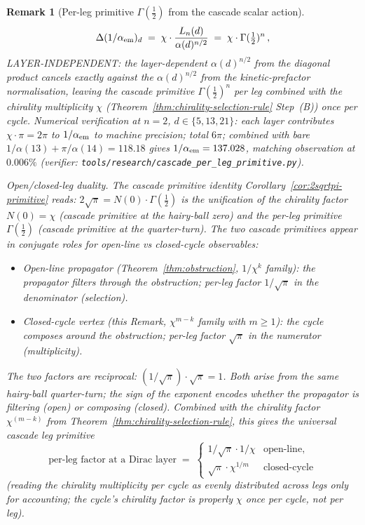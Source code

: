 \documentclass[12pt,a4paper]{article}
\newtheorem*{remark}{Remark}
\begin{document}
\begin{remark}[Per-leg primitive $\Gamma(\tfrac{1}{2})$ from the cascade scalar action]
\[\Delta(1/\alpha_{\rm em})_d \;=\; \chi\cdot\frac{L_n(d)}{\alpha(d)^{n/2}} \;=\; \chi\cdot\Gamma(\tfrac{1}{2})^n\,,
\]
LAYER-INDEPENDENT: the layer-dependent $\alpha(d)^{n/2}$ from the diagonal product cancels exactly against the $\alpha(d)^{n/2}$ from the kinetic-prefactor normalisation, leaving the cascade primitive $\Gamma(\tfrac{1}{2})^n$ per leg combined with the chirality multiplicity $\chi$ (Theorem~\ref{thm:chirality-selection-rule} Step~(B)) once per cycle. Numerical verification at $n=2$, $d\in\{5,13,21\}$: each layer contributes $\chi\cdot\pi = 2\pi$ to $1/\alpha_{\rm em}$ to machine precision; total $6\pi$; combined with bare $1/\alpha(13) + \pi/\alpha(14) = 118.18$ gives $1/\alpha_{\rm em} = 137.028$, matching observation at $0.006\%$ (verifier: \texttt{tools/research/cascade\_per\_leg\_primitive.py}).

\medskip\noindent\emph{Open/closed-leg duality.} The cascade primitive identity Corollary~\ref{cor:2sqrtpi-primitive} reads: $2\sqrt{\pi} = N(0)\cdot\Gamma(\tfrac{1}{2})$ is the unification of the chirality factor $N(0)=\chi$ (cascade primitive at the hairy-ball zero) and the per-leg primitive $\Gamma(\tfrac{1}{2})$ (cascade primitive at the quarter-turn). The two cascade primitives appear in conjugate roles for open-line vs closed-cycle observables:
\begin{itemize}[nosep]
\item \emph{Open-line propagator} (Theorem~\ref{thm:obstruction}, $1/\chi^k$ family): the propagator filters through the obstruction; per-leg factor $1/\sqrt{\pi}$ in the denominator (selection).
\item \emph{Closed-cycle vertex} (this Remark, $\chi^{m-k}$ family with $m\geq 1$): the cycle composes around the obstruction; per-leg factor $\sqrt{\pi}$ in the numerator (multiplicity).
\end{itemize}
The two factors are reciprocal: $(1/\sqrt{\pi})\cdot\sqrt{\pi} = 1$. Both arise from the same hairy-ball quarter-turn; the sign of the exponent encodes whether the propagator is filtering (open) or composing (closed). Combined with the chirality factor $\chi^{(m-k)}$ from Theorem~\ref{thm:chirality-selection-rule}, this gives the universal cascade leg primitive
\[
\text{per-leg factor at a Dirac layer} \;=\; \begin{cases} 1/\sqrt{\pi} \cdot 1/\chi & \text{open-line}, \\ \sqrt{\pi} \cdot \chi^{1/m} & \text{closed-cycle} \end{cases}
\]
(reading the chirality multiplicity per cycle as evenly distributed across legs only for accounting; the cycle's chirality factor is properly $\chi$ once per cycle, not per leg).


\end{remark}
\end{document}
